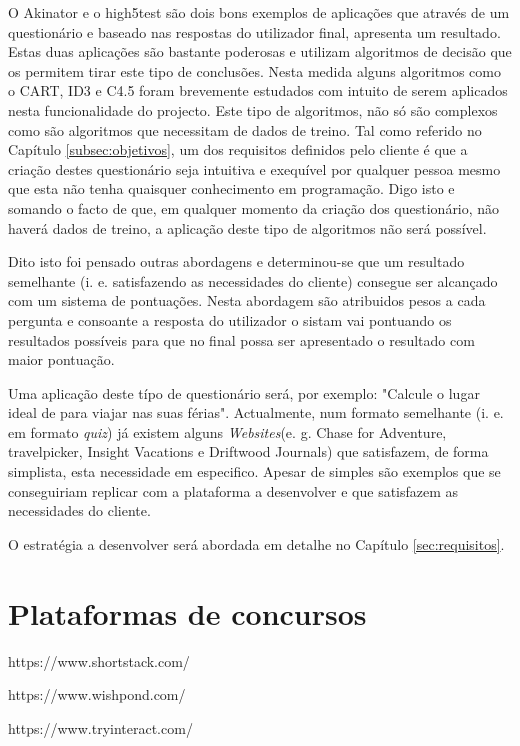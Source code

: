 O Akinator\cite{akinator} e o high5test\cite{5} são dois bons exemplos de aplicações que através de um questionário e baseado nas respostas do utilizador final, apresenta um resultado. Estas duas aplicações são bastante poderosas e utilizam algoritmos de decisão que os permitem tirar este tipo de conclusões. Nesta medida alguns algoritmos como o CART\cite{cart}, ID3\cite{id3}\cite{id3_2}\cite{cart} e C4.5\cite{cart}\cite{c4.5} foram brevemente estudados com intuito de serem aplicados nesta funcionalidade do projecto. Este tipo de algoritmos, não só são complexos como são algoritmos que necessitam de dados de treino. Tal como referido no Capítulo \ref{subsec:objetivos}, um dos requisitos definidos pelo cliente é que a criação destes questionário seja intuitiva e exequível por qualquer pessoa mesmo que esta não tenha quaisquer conhecimento em programação. Digo isto e somando o facto de que, em qualquer momento da criação dos questionário, não haverá dados de treino, a aplicação deste tipo de algoritmos não será possível.

Dito isto foi pensado outras abordagens e determinou-se que um resultado semelhante (i. e. satisfazendo as necessidades do cliente) consegue ser alcançado com um sistema de pontuações. Nesta abordagem são atribuidos pesos a cada pergunta e consoante a resposta do utilizador o sistam vai pontuando os resultados possíveis para que no final possa ser apresentado o resultado com maior pontuação.

Uma aplicação deste típo de questionário será, por exemplo: "Calcule o lugar ideal de para viajar nas suas férias". Actualmente, num formato semelhante (i. e. em formato \textit{quiz}) já existem alguns \textit{Websites}(e. g. Chase for Adventure\cite{chaseforadventure}, travelpicker\cite{travelpicker}, Insight Vacations\cite{insightvacations} e Driftwood Journals\cite{driftwoodjournals}) que satisfazem, de forma simplista, esta necessidade em especifico. Apesar de simples são exemplos que se conseguiriam replicar com a plataforma a desenvolver e que satisfazem as necessidades do cliente. 

O estratégia a desenvolver será abordada em detalhe no Capítulo \ref{sec:requisitos}.
\section{Plataformas de concursos}
https://www.shortstack.com/

https://www.wishpond.com/

https://www.tryinteract.com/

